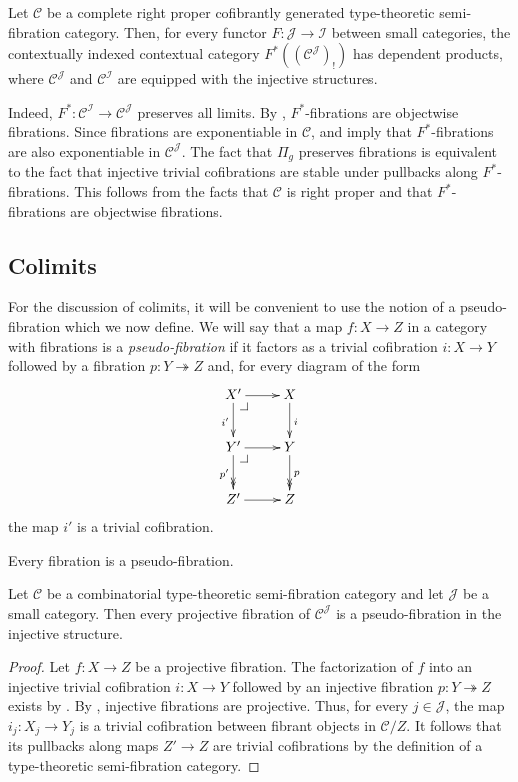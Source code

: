 \documentclass[reqno]{amsart}
\makeatletter
\theoremstyle{definition}
\theoremstyle{remark}
\newcommand{\scat}[1]{\mathcal{#1}}
\numberwithin{figure}{section}
\newcommand{\pb}[1][dr]{\save*!/#1-1.2pc/#1:(-1,1)@^{|-}\restore}
\makeatother
\begin{document}
\begin{example}[products]
Let $\scat{C}$ be a complete right proper cofibrantly generated type-theoretic semi-fibration category.
Then, for every functor $F : \scat{J} \to \scat{I}$ between small categories, the contextually indexed contextual category $F^*((\scat{C}^\scat{J})_!)$ has dependent products,
where $\scat{C}^\scat{J}$ and $\scat{C}^\scat{I}$ are equipped with the injective structures.

Indeed, $F^* : \scat{C}^\scat{I} \to \scat{C}^\scat{J}$ preserves all limits.
By , $F^*$-fibrations are objectwise fibrations.
Since fibrations are exponentiable in $\scat{C}$, \cite[Theorem~2.12]{comp-fact-tor} and \cite[Corollary~2.6]{comp-fact-tor} imply that $F^*$-fibrations are also exponentiable in $\scat{C}^\scat{J}$.
The fact that $\Pi_g$ preserves fibrations is equivalent to the fact that injective trivial cofibrations are stable under pullbacks along $F^*$-fibrations.
This follows from the facts that $\scat{C}$ is right proper and that $F^*$-fibrations are objectwise fibrations.
\end{example}

\subsection{Colimits}

For the discussion of colimits, it will be convenient to use the notion of a pseudo-fibration which we now define.
We will say that a map $f : X \to Z$ in a category with fibrations is a \emph{pseudo-fibration} if it factors as a trivial cofibration $i : X \to Y$ followed by a fibration $p : Y \twoheadrightarrow Z$ and, for every diagram of the form
\[ \xymatrix{ X' \ar[r] \ar[d]_{i'} \pb         & X \ar[d]^i \\
              Y' \ar[r] \ar@{->>}[d]_{p'} \pb   & Y \ar@{->>}[d]^p \\
              Z' \ar[r]                         & Z
            } \]
the map $i'$ is a trivial cofibration.

\begin{example}
Every fibration is a pseudo-fibration.
\end{example}

\begin{lem}
Let $\scat{C}$ be a combinatorial type-theoretic semi-fibration category and let $\scat{J}$ be a small category.
Then every projective fibration of $\scat{C}^\scat{J}$ is a pseudo-fibration in the injective structure.
\end{lem}
\begin{proof}
Let $f : X \to Z$ be a projective fibration.
The factorization of $f$ into an injective trivial cofibration $i : X \to Y$ followed by an injective fibration $p : Y \twoheadrightarrow Z$ exists by \cite[Lemma~A.2.8.3]{lurie-topos}.
By , injective fibrations are projective.
Thus, for every $j \in \scat{J}$, the map $i_j : X_j \to Y_j$ is a trivial cofibration between fibrant objects in $\scat{C}/Z$.
It follows that its pullbacks along maps $Z' \to Z$ are trivial cofibrations by the definition of a type-theoretic semi-fibration category.
\end{proof}
\end{document}
